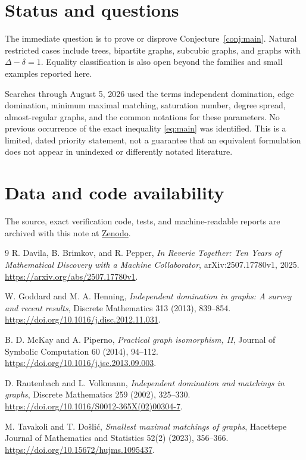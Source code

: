 \documentclass[11pt]{article}
\begin{document}
\section{Status and questions}
The immediate question is to prove or disprove Conjecture~\ref{conj:main}. Natural restricted cases include trees, bipartite graphs, subcubic graphs, and graphs with $\Delta-\delta=1$. Equality classification is also open beyond the families and small examples reported here.

Searches through August 5, 2026 used the terms independent domination, edge domination, minimum maximal matching, saturation number, degree spread, almost-regular graphs, and the common notations for these parameters. No previous occurrence of the exact inequality \eqref{eq:main} was identified. This is a limited, dated priority statement, not a guarantee that an equivalent formulation does not appear in unindexed or differently notated literature.

\section*{Data and code availability}
The source, exact verification code, tests, and machine-readable reports are archived with this note at
\href{https://doi.org/10.5281/zenodo.21806398}{Zenodo}.

\begin{thebibliography}{9}
R. Davila, B. Brimkov, and R. Pepper,
\emph{In Reverie Together: Ten Years of Mathematical Discovery with a Machine Collaborator},
arXiv:2507.17780v1, 2025.
\url{https://arxiv.org/abs/2507.17780v1}.

W. Goddard and M. A. Henning,
\emph{Independent domination in graphs: A survey and recent results},
Discrete Mathematics 313 (2013), 839--854.
\url{https://doi.org/10.1016/j.disc.2012.11.031}.

B. D. McKay and A. Piperno,
\emph{Practical graph isomorphism, II},
Journal of Symbolic Computation 60 (2014), 94--112.
\url{https://doi.org/10.1016/j.jsc.2013.09.003}.

D. Rautenbach and L. Volkmann,
\emph{Independent domination and matchings in graphs},
Discrete Mathematics 259 (2002), 325--330.
\url{https://doi.org/10.1016/S0012-365X(02)00304-7}.

M. Tavakoli and T. Do\v{s}li\'c,
\emph{Smallest maximal matchings of graphs},
Hacettepe Journal of Mathematics and Statistics 52(2) (2023), 356--366.
\url{https://doi.org/10.15672/hujms.1095437}.
\end{thebibliography}
\end{document}
